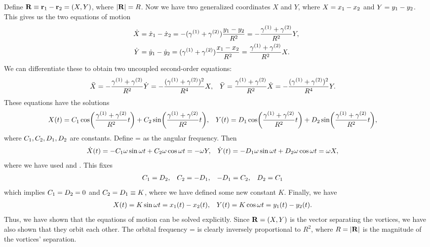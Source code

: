 \begin{solution}
	Define $\mathbf{R} \equiv \mathbf{r}_1 - \mathbf{r}_2 = (X, Y)$, where $|\mathbf{R}| = R$.  Now we have two generalized coordinates $X$ and $Y$, where $X = x_1 - x_2$ and $Y = y_1 - y_2$.  This gives us the two equations of motion
	\begin{align}
		\dot{X} &= \dot{x}_1 - \dot{x}_2
		= -(\gamma^{(1)} + \gamma^{(2)}) \frac{y_1 - y_2}{R^2}
		= -\frac{\gamma^{(1)} + \gamma^{(2)}}{R^2} Y, \label{eqnX} \\
		\dot{Y} &= \dot{y}_1 - \dot{y}_2
		= (\gamma^{(1)} + \gamma^{(2)}) \frac{x_1 - x_2}{R^2}
		= \frac{\gamma^{(1)} + \gamma^{(2)}}{R^2} X. \label{eqnY}
	\end{align}
	We can differentiate these to obtain two uncoupled second-order equations:
	\begin{align*}
		\ddot{X} &= -\frac{\gamma^{(1)} + \gamma^{(2)}}{R^2} \dot{Y}
		= -\frac{(\gamma^{(1)} + \gamma^{(2)})^2}{R^4} X, &
		\ddot{Y} &= \frac{\gamma^{(1)} + \gamma^{(2)}}{R^2} \dot{X}
		= -\frac{(\gamma^{(1)} + \gamma^{(2)})^2}{R^4} Y.
	\end{align*}
	These equations have the solutions
	\begin{align*}
		X(t) &= C_1 \cos(\frac{\gamma^{(1)} + \gamma^{(2)}}{R^2} t) + C_2 \sin(\frac{\gamma^{(1)} + \gamma^{(2)}}{R^2} t), &
		Y(t) &= D_1 \cos(\frac{\gamma^{(1)} + \gamma^{(2)}}{R^2} t) + D_2 \sin(\frac{\gamma^{(1)} + \gamma^{(2)}}{R^2} t),
	\end{align*}
	where $C_1, C_2, D_1, D_2$ are constants.  Define
	\beq
		\omg = 
	\eeq
	as the angular frequency.  Then
	\begin{align*}
		\dot{X}(t) &= -C_1 \omega \sin{\omega t} + C_2 \omega \cos{\omega t} = -\omega Y, &
		\dot{Y}(t) &= -D_1 \omega \sin{\omega t} + D_2 \omega \cos{\omega t} = \omega X,
	\end{align*}
	where we have used  and .  This fixes
	\begin{align*}
		C_1 &= D_2, &
		C_2 &= -D_1, &
		-D_1 &= C_2, &
		D_2 &= C_1
	\end{align*}
	which implies $C_1 = D_2 = 0$ and $C_2 = D_1 \equiv K$, where we have defined some new constant $K$.  Finally, we have
	\begin{align*}
		X(t) &= K \sin{\omega t} = x_1(t) - x_2(t), &
		Y(t) &= K \cos{\omega t} = y_1(t) - y_2(t).
	\end{align*}
	Thus, we have shown that the equations of motion  can be solved explicitly.  Since $\mathbf{R} = (X, Y)$ is the vector separating the vortices, we have also shown that they orbit each other.  The orbital frequency
	\beq
		\omg = 
	\eeq
	is clearly inversely proportional to $R^2$, where $R = |\mathbf{R}|$ is the magnitude of the vortices' separation.
\end{solution}